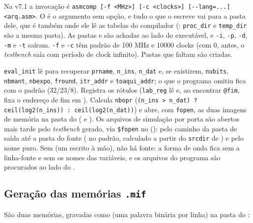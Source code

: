 Na v7.1 a invocação é \lstinline|asmcomp [-f <MHz>] [-c <clocks>] [--lang=...] <arq.asm>|.
O  é o argumento sem opção, e tudo o que o  escreve vai
para a pasta dele, que é também onde ele lê as tabelas do compilador
(: \lstinline|proc_dir| e \lstinline|temp_dir| são a
mesma pasta). As pastas  e  são achadas ao lado do
executável, e \lstinline|-i|, \lstinline|-p|, \lstinline|-d|, \lstinline|-m| e
\lstinline|-t| saíram. \lstinline|-f| e \lstinline|-c| têm padrão de 100 MHz e
10000 clocks (com 0, antes, o \emph{testbench} saía com período de clock
infinito). Pastas que faltam são criadas.

\lstinline|eval_init| lê  para recuperar \lstinline|prname|,
\lstinline|n_ins|, \lstinline|n_dat| e, se existirem, \lstinline|nubits|,
\lstinline|nbmant|, \lstinline|nbexpo|, \lstinline|fround|, \lstinline|itr_addr| e
\lstinline|toaqui_addr|; o que o programa omitiu fica com o padrão (32/23/8).
Registra os rótulos (\lstinline|lab_reg| lê  e, ao encontrar
\lstinline|@fim|, fixa o endereço de fim em ). Calcula
\lstinline|nbopr| (\lstinline|(n_ins > n_dat) ? ceil(log2(n_ins)) : ceil(log2(n_dat))|)
e abre, com \lstinline|fopen|, as duas imagens de memória na pasta do
 ( e ). Os arquivos de
simulação por porta são abertos mais tarde pelo \emph{testbench} gerado, via
\lstinline|$fopen| no  (): 
pelo caminho da pasta de saída até a pasta do fonte ( no
padrão, calculado a partir do \lstinline|srcdir| de ) e
 pelo nome puro. Sem  (um 
escrito à mão), não há fonte: a forma de onda fica sem a linha-fonte e sem os nomes
das variáveis, e os arquivos do programa são procurados ao lado do .

\subsection{Geração das memórias \texttt{.mif}}
\label{sec:yanc-asmcomp-mif}

São duas memórias, gravadas como  (uma palavra binária por linha) na
pasta do :

